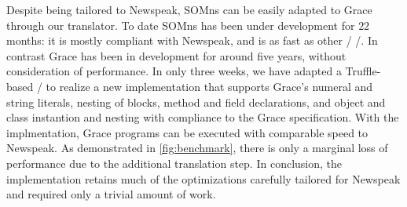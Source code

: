 Despite being tailored to Newspeak, SOMns can be easily adapted to Grace through our translator. To date SOMns has been under development for $22$ months: it is mostly compliant with Newspeak, and is as fast as other \JITing/ \VMs/. In contrast Grace has been in development for around five years, without consideration of performance. In only three weeks, we have adapted a Truffle-based \VM/ to realize a new implementation that supports Grace's numeral and string literals, nesting of blocks, method and field declarations, and object and class instantion and nesting with compliance to the Grace specification\footnotemark.  With the implmentation, Grace programs can be executed with comparable speed to Newspeak. As demonstrated in \autoref{fig:benchmark}, there is only a marginal loss of performance due to the additional translation step. In conclusion, the implementation retains much of the optimizations carefully tailored for Newspeak and required only a trivial amount of work.



